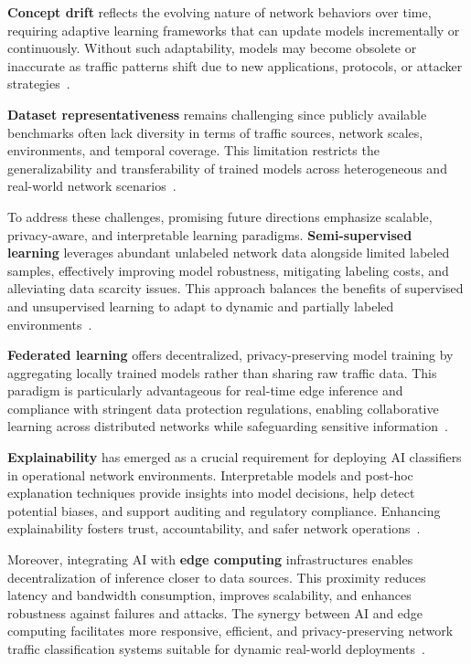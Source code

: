 \documentclass[sigconf]{acmart}
\begin{document}
\textbf{Concept drift} reflects the evolving nature of network behaviors over time, requiring adaptive learning frameworks that can update models incrementally or continuously. Without such adaptability, models may become obsolete or inaccurate as traffic patterns shift due to new applications, protocols, or attacker strategies~\cite{ref51}.

\textbf{Dataset representativeness} remains challenging since publicly available benchmarks often lack diversity in terms of traffic sources, network scales, environments, and temporal coverage. This limitation restricts the generalizability and transferability of trained models across heterogeneous and real-world network scenarios~\cite{ref51}.

To address these challenges, promising future directions emphasize scalable, privacy-aware, and interpretable learning paradigms. \textbf{Semi-supervised learning} leverages abundant unlabeled network data alongside limited labeled samples, effectively improving model robustness, mitigating labeling costs, and alleviating data scarcity issues. This approach balances the benefits of supervised and unsupervised learning to adapt to dynamic and partially labeled environments~\cite{ref50,ref51}.

\textbf{Federated learning} offers decentralized, privacy-preserving model training by aggregating locally trained models rather than sharing raw traffic data. This paradigm is particularly advantageous for real-time edge inference and compliance with stringent data protection regulations, enabling collaborative learning across distributed networks while safeguarding sensitive information~\cite{ref49,ref50,ref51}.

\textbf{Explainability} has emerged as a crucial requirement for deploying AI classifiers in operational network environments. Interpretable models and post-hoc explanation techniques provide insights into model decisions, help detect potential biases, and support auditing and regulatory compliance. Enhancing explainability fosters trust, accountability, and safer network operations~\cite{ref50,ref51}.

Moreover, integrating AI with \textbf{edge computing} infrastructures enables decentralization of inference closer to data sources. This proximity reduces latency and bandwidth consumption, improves scalability, and enhances robustness against failures and attacks. The synergy between AI and edge computing facilitates more responsive, efficient, and privacy-preserving network traffic classification systems suitable for dynamic real-world deployments~\cite{ref49,ref51}.
\end{document}
